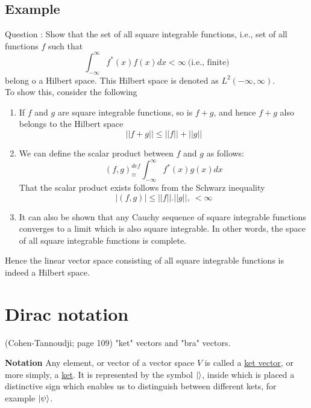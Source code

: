 \subsection{Example}
Question : Show that the set of all square integrable functions, i.e., set of all functions $f$ such that
\begin{equation}
\int_{-\infty}^{\infty} f^*(x) f(x) dx < \infty \ \text{(i.e., finite)}
\end{equation}
belong o a Hilbert space. This Hilbert space is denoted as $L^2(-\infty, \infty)$.\\
To show this, consider the following
\begin{enumerate}
	\item 
	If $f$ and $g$ are square integrable functions, so  is $f+g$, and hence $f+g$ also belongs to the Hilbert space
	\begin{equation}
	||f+g|| \leq ||f|| + ||g||
	\end{equation}
	
	\item 
	We can define the scalar product between $f$ and $g$ as follows:
	\begin{equation}
	(f, g) _\equiv^{def} \int_{-\infty}^{\infty} f^*(x) g(x) dx
	\end{equation}
	That the scalar product exists follows from the Schwarz inequality
	\begin{equation}
	|(f, g)| \leq ||f|| . ||g||, \ < \infty
	\end{equation}
	
	
	\item 
	It can also be shown that any Cauchy sequence of square integrable functions converges to a limit which is also square integrable. In other words, the space of all square integrable functions is complete.
\end{enumerate}
Hence the linear vector space consisting of all square integrable functions is indeed a Hilbert space.

\section{Dirac notation}
(Cohen-Tannoudji; page 109)
"ket" vectors and "bra" vectors.

\textbf{Notation}\newline
Any element, or vector of a vector space $V$ is called a \underline{ket vector}, or more simply, a \underline{ket}. It is represented by the symbol $\ket{}$, inside which is placed a distinctive sign which enables us to distinguish between different kets, for example $\ket{\psi}$.

